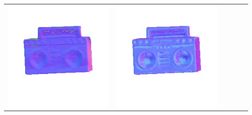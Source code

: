 \begin{center}
\begin{tabularx}{\linewidth}{@{}Y@{}Y@{}Y@{}Y@{}Y@{}Y@{}}
\includegraphics[width=\linewidth]{semisynthetic/20150514_19_yu_out.png} &
\includegraphics[width=\linewidth]{semisynthetic/20150514_19_dpsn_out.png} &

\end{tabularx}
\end{center}
